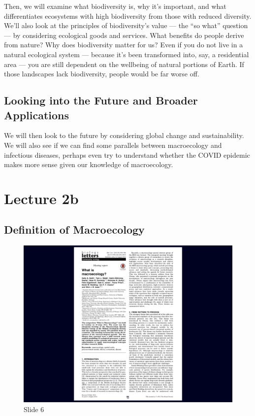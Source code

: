 \documentclass[
  10pt,
]{book}
\begin{document}
Then, we will examine what biodiversity is, why it's important, and what
differentiates ecosystems with high biodiversity from those with reduced
diversity. We'll also look at the principles of biodiversity's value ---
the ``so what'' question --- by considering ecological goods and
services. What benefits do people derive from nature? Why does
biodiversity matter for us? Even if you do not live in a natural
ecological system --- because it's been transformed into, say, a
residential area --- you are still dependent on the wellbeing of natural
portions of Earth. If those landscapes lack biodiversity, people would
be far worse off.

\section{Looking into the Future and Broader
Applications}\label{looking-into-the-future-and-broader-applications}

We will then look to the future by considering global change and
sustainability. We will also see if we can find some parallels between
macroecology and infectious diseases, perhaps even try to understand
whether the COVID epidemic makes more sense given our knowledge of
macroecology.

\chapter*{Lecture 2b}\label{lecture-2b}

\section{Definition of Macroecology}\label{definition-of-macroecology}

\begin{figure}[ht]
\centering
\includegraphics[width=0.8\linewidth]{../images/BDC334/BDC334-006.jpeg}
\caption*{Slide 6}
\end{figure}
\end{document}
